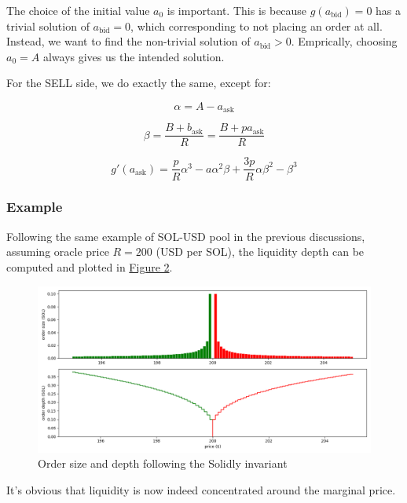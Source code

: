 \documentclass{article}
\begin{document}
The choice of the initial value $a_0$ is important. This is because $g(a_{\mathrm{bid}}) = 0$ has a trivial solution of $a_{\mathrm{bid}} = 0$, which corresponding to not placing an order at all. Instead, we want to find the non-trivial solution of $a_{\mathrm{bid}} > 0$. Emprically, choosing $a_0 = A$ always gives us the intended solution.

For the SELL side, we do exactly the same, except for:

\begin{equation}
  \alpha = A - a_{\mathrm{ask}}
\end{equation}

\begin{equation}
  \beta = \frac{B + b_{\mathrm{ask}}}{R} = \frac{B + p a_{\mathrm{ask}}}{R}
\end{equation}

\begin{equation}
  g'(a_{\mathrm{ask}}) = \frac{p}{R} \alpha^3 - a \alpha^2 \beta + \frac{3p}{R} \alpha \beta^2 - \beta^3
\end{equation}

\subsubsection{Example}

Following the same example of SOL-USD pool in the previous discussions, assuming oracle price $R = 200$ (USD per SOL), the liquidity depth can be computed and plotted in \hyperref[fig:2]{Figure 2}.

\begin{figure}
  \includegraphics[width=\textwidth]{2-solidly.png}
  \caption{Order size and depth following the Solidly invariant}
  \label{fig:2}
\end{figure}

It's obvious that liquidity is now indeed concentrated around the marginal price.
\end{document}
